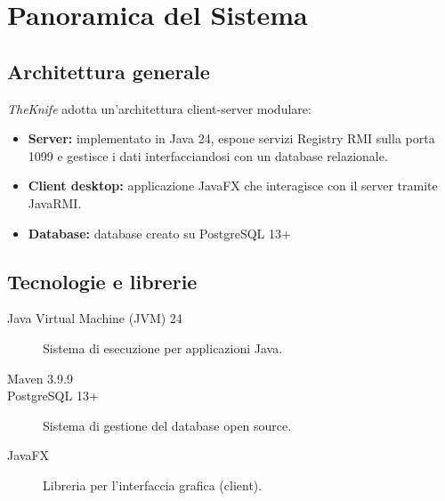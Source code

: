 \section{Panoramica del Sistema}
\label{cap:panoramica}
\subsection{Architettura generale}
\emph{TheKnife} adotta un'architettura client-server modulare:
\begin{itemize}
    \item \textbf{Server:} implementato in Java 24, 
    espone servizi Registry RMI sulla porta 1099 e 
    gestisce i dati interfacciandosi con un database relazionale.
    \item \textbf{Client desktop:} applicazione JavaFX 
    che interagisce con il server tramite JavaRMI.
    \item \textbf{Database:} database creato su PostgreSQL 13+
\end{itemize}

\subsection{Tecnologie e librerie}
\begin{description}
    \item[Java Virtual Machine (JVM) 24] Sistema di esecuzione per applicazioni Java.
    \item[Maven 3.9.9]
    \item[PostgreSQL 13+] Sistema di gestione del database open source.
    \item[JavaFX] Libreria per l'interfaccia grafica (client).
\end{description}
